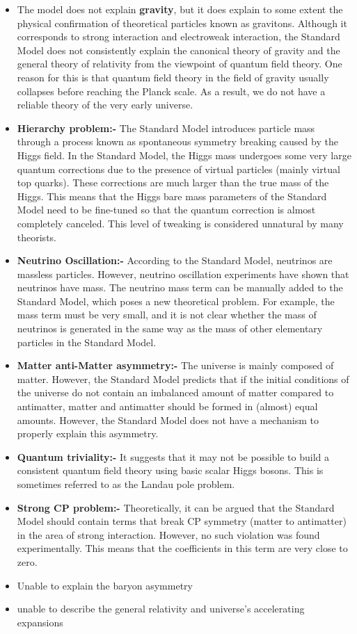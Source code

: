 \begin{itemize}
    \item The model does not explain \textbf{gravity}, but it does explain to some extent the physical confirmation of  theoretical particles known as gravitons. Although it corresponds to  strong interaction and electroweak interaction, the Standard Model does not consistently explain the canonical theory of gravity and the general theory of relativity from the viewpoint of quantum field theory. One reason for this is that quantum field theory in the field of gravity usually collapses before reaching the Planck scale. As a result, we do not have a reliable theory of the very early universe.
    
    \item \textbf{Hierarchy problem:-} The Standard Model introduces particle mass through a process known as spontaneous symmetry breaking caused by the Higgs field. In the Standard Model, the Higgs mass undergoes some very large quantum corrections due to the presence of virtual particles (mainly virtual top quarks). These corrections are much larger than the true mass of the Higgs. This means that the Higgs bare mass parameters of the Standard Model need to be fine-tuned so that the quantum correction is almost completely canceled\cite{Aad_2015}. This level of tweaking is considered unnatural by many theorists.
 \item \textbf{Neutrino Oscillation:-} According to the Standard Model, neutrinos are massless particles. However, neutrino oscillation experiments have shown that neutrinos  have mass. The neutrino mass term can be manually added to the Standard Model, which poses a new theoretical problem\cite{neutino_1}. For example, the mass term must be very small, and it is not clear whether the mass of neutrinos is generated in the same way as the mass of other elementary particles  in the Standard Model.\cite{Ellis_2020}
 \item \textbf{Matter anti-Matter asymmetry:-} The universe is mainly composed of  matter. However, the Standard Model predicts that if the initial conditions of the universe do not contain an imbalanced amount of matter compared to antimatter, matter and antimatter should be formed in (almost) equal amounts\cite{Dasgupta_2020}. However, the Standard Model does not have a mechanism to properly explain this asymmetry.
 \item \textbf{Quantum triviality:-} It suggests that it may not be possible to build a consistent quantum field theory using basic scalar Higgs bosons. This is sometimes referred to as the Landau pole problem.
 \item \textbf{Strong CP problem:-} Theoretically, it can be argued that the Standard Model should contain terms that break CP symmetry (matter to antimatter) in the area of strong interaction. However, no such violation was found experimentally. This means that the coefficients in this term are very close to zero.
\item Unable to explain the baryon asymmetry
\item unable to describe the general relativity and universe's accelerating expansions
\end{itemize}   

